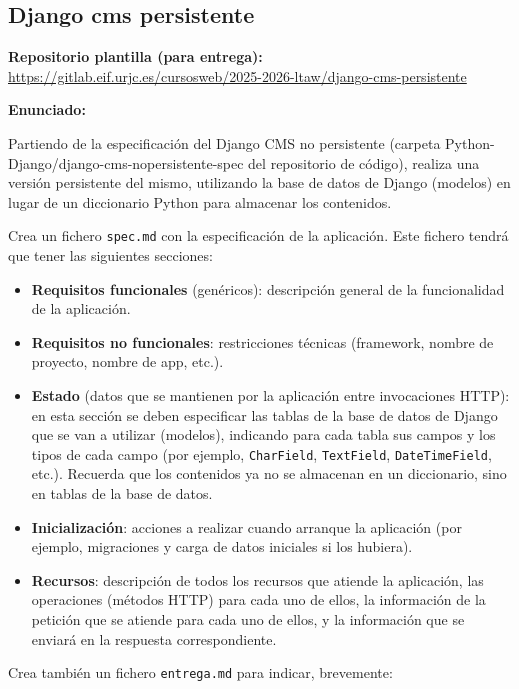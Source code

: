 \subsection{Django cms persistente}
\label{subsec:django-cms-persistente}

\textbf{Repositorio plantilla (para entrega):} \\
\url{https://gitlab.eif.urjc.es/cursosweb/2025-2026-ltaw/django-cms-persistente}

\textbf{Enunciado:}

Partiendo de la especificación del Django CMS no persistente (carpeta Python-Django/django-cms-nopersistente-spec del repositorio de código), realiza una versión persistente del mismo, utilizando la base de datos de Django (modelos) en lugar de un diccionario Python para almacenar los contenidos.

Crea un fichero \texttt{spec.md} con la especificación de la aplicación. Este fichero tendrá que tener las siguientes secciones:

\begin{itemize}
\item \textbf{Requisitos funcionales} (genéricos): descripción general de la funcionalidad de la aplicación.
\item \textbf{Requisitos no funcionales}: restricciones técnicas (framework, nombre de proyecto, nombre de app, etc.).
\item \textbf{Estado} (datos que se mantienen por la aplicación entre invocaciones HTTP): en esta sección se deben especificar las tablas de la base de datos de Django que se van a utilizar (modelos), indicando para cada tabla sus campos y los tipos de cada campo (por ejemplo, \texttt{CharField}, \texttt{TextField}, \texttt{DateTimeField}, etc.). Recuerda que los contenidos ya no se almacenan en un diccionario, sino en tablas de la base de datos.
\item \textbf{Inicialización}: acciones a realizar cuando arranque la aplicación (por ejemplo, migraciones y carga de datos iniciales si los hubiera).
\item \textbf{Recursos}: descripción de todos los recursos que atiende la aplicación, las operaciones (métodos HTTP) para cada uno de ellos, la información de la petición que se atiende para cada uno de ellos, y la información que se enviará en la respuesta correspondiente.
\end{itemize}

Crea también un fichero \texttt{entrega.md} para indicar, brevemente:

